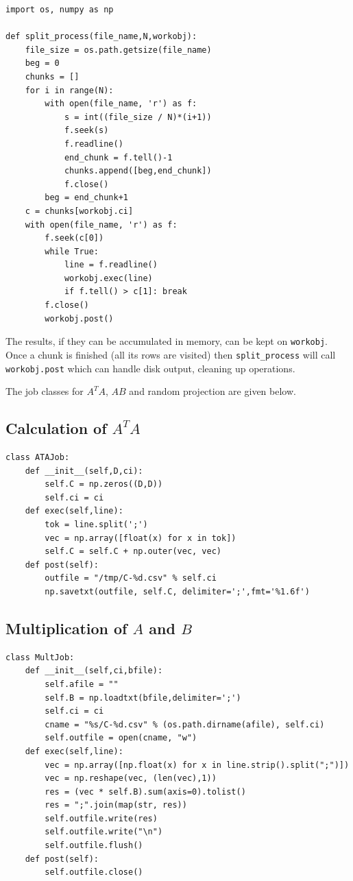 \documentclass{article}
\begin{document}
\begin{verbatim}
import os, numpy as np

def split_process(file_name,N,workobj):
    file_size = os.path.getsize(file_name)
    beg = 0
    chunks = []
    for i in range(N):
        with open(file_name, 'r') as f:
            s = int((file_size / N)*(i+1))
            f.seek(s)
            f.readline()
            end_chunk = f.tell()-1
            chunks.append([beg,end_chunk])
            f.close()
        beg = end_chunk+1
    c = chunks[workobj.ci]
    with open(file_name, 'r') as f:
        f.seek(c[0])
        while True:
            line = f.readline()
            workobj.exec(line)
            if f.tell() > c[1]: break
        f.close()
        workobj.post()
\end{verbatim}

The results, if they can be accumulated in memory, can be kept on
\verb!workobj!. Once a chunk is finished (all its rows are visited) then
\verb!split_process! will call \verb!workobj.post! which can handle disk output,
cleaning up operations.

The job classes for $A^T A$, $AB$ and random projection are given below.

\subsection{Calculation of $A^T A$}

\begin{verbatim}
class ATAJob:
    def __init__(self,D,ci):
        self.C = np.zeros((D,D))
        self.ci = ci
    def exec(self,line):
        tok = line.split(';')
        vec = np.array([float(x) for x in tok])
        self.C = self.C + np.outer(vec, vec)
    def post(self):
        outfile = "/tmp/C-%d.csv" % self.ci
        np.savetxt(outfile, self.C, delimiter=';',fmt='%1.6f')
\end{verbatim}

\subsection{Multiplication of $A$ and $B$}

\begin{verbatim}
class MultJob:
    def __init__(self,ci,bfile):
        self.afile = ""
        self.B = np.loadtxt(bfile,delimiter=';')
        self.ci = ci
        cname = "%s/C-%d.csv" % (os.path.dirname(afile), self.ci)
        self.outfile = open(cname, "w")        
    def exec(self,line):        
        vec = np.array([np.float(x) for x in line.strip().split(";")])
        vec = np.reshape(vec, (len(vec),1))
        res = (vec * self.B).sum(axis=0).tolist()  
        res = ";".join(map(str, res))
        self.outfile.write(res)
        self.outfile.write("\n")
        self.outfile.flush()
    def post(self):
        self.outfile.close()
\end{verbatim}
\end{document}
